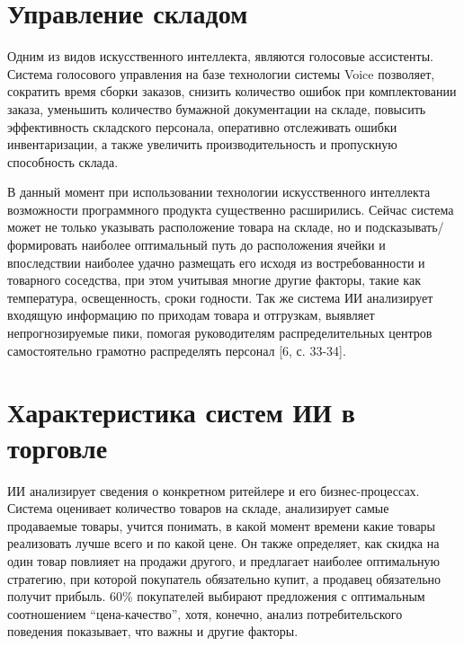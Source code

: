 \documentclass{article}
\begin{document}
\section{Управление складом}
\normalsize{\hspace{5mm}Одним из видов искусственного интеллекта, являются голосовые ассистенты. Система голосового управления на базе технологии системы Voice позволяет, сократить время сборки заказов, снизить количество ошибок при комплектовании заказа, уменьшить количество бумажной документации на складе, повысить эффективность складского персонала, оперативно отслеживать ошибки инвентаризации, а также увеличить производительность и пропускную способность склада.

В данный момент при использовании технологии искусственного интеллекта возможности программного продукта существенно расширились. Сейчас система может не только указывать расположение товара на складе, но и подсказывать/формировать наиболее оптимальный путь до расположения ячейки и впоследствии наиболее удачно размещать его исходя из востребованности и товарного соседства, при этом учитывая многие другие факторы, такие как температура, освещенность, сроки годности. Так же система ИИ анализирует входящую информацию по приходам товара и отгрузкам, выявляет непрогнозируемые пики, помогая руководителям распределительных центров самостоятельно грамотно распределять персонал [6, с. 33-34].}

\section*{\hspace{10mm}Характеристика систем ИИ в торговле}
\normalsize{\hspace{5mm}ИИ анализирует сведения о конкретном ритейлере и его бизнес-процессах. Система оценивает количество товаров на складе, анализирует самые продаваемые товары, учится понимать, в какой момент времени какие товары реализовать лучше всего и по какой цене. Он также определяет, как скидка на один товар повлияет на продажи другого, и предлагает наиболее оптимальную стратегию, при которой покупатель обязательно купит, а продавец обязательно получит прибыль. 60\% покупателей выбирают предложения с оптимальным соотношением “цена-качество”, хотя, конечно, анализ потребительского поведения показывает, что важны и другие факторы.}
\end{document}
